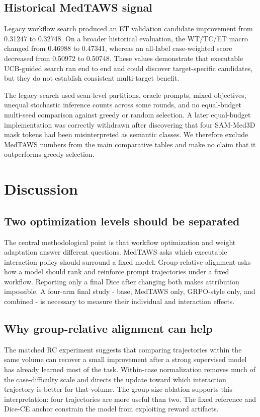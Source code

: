 \documentclass[10pt]{article}
\begin{document}
\subsection{Historical MedTAWS signal}
Legacy workflow search produced an ET validation candidate improvement from 0.31247 to 0.32748. On a broader historical evaluation, the WT/TC/ET macro changed from 0.46988 to 0.47341, whereas an all-label case-weighted score decreased from 0.50972 to 0.50748. These values demonstrate that executable UCB-guided search ran end to end and could discover target-specific candidates, but they do not establish consistent multi-target benefit.

The legacy search used scan-level partitions, oracle prompts, mixed objectives, unequal stochastic inference counts across some rounds, and no equal-budget multi-seed comparison against greedy or random selection. A later equal-budget implementation was correctly withdrawn after discovering that four SAM-Med3D mask tokens had been misinterpreted as semantic classes. We therefore exclude MedTAWS numbers from the main comparative tables and make no claim that it outperforms greedy selection.

\section{Discussion}
\subsection{Two optimization levels should be separated}
The central methodological point is that workflow optimization and weight adaptation answer different questions. MedTAWS asks which executable interaction policy should surround a fixed model. Group-relative alignment asks how a model should rank and reinforce prompt trajectories under a fixed workflow. Reporting only a final Dice after changing both makes attribution impossible. A four-arm final study - base, MedTAWS only, GRPO-style only, and combined - is necessary to measure their individual and interaction effects.

\subsection{Why group-relative alignment can help}
The matched RC experiment suggests that comparing trajectories within the same volume can recover a small improvement after a strong supervised model has already learned most of the task. Within-case normalization removes much of the case-difficulty scale and directs the update toward which interaction trajectory is better for that volume. The group-size ablation supports this interpretation: four trajectories are more useful than two. The fixed reference and Dice-CE anchor constrain the model from exploiting reward artifacts.
\end{document}
